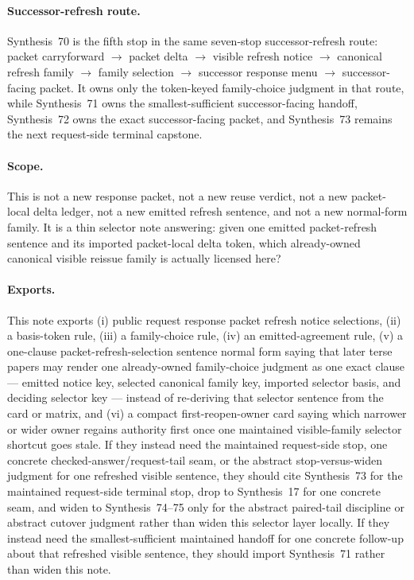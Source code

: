 \documentclass[11pt]{article}
\begin{document}
\paragraph{Successor-refresh route.}
Synthesis~70 is the fifth stop in the same seven-stop successor-refresh route: packet carryforward $\rightarrow$ packet delta $\rightarrow$ visible refresh notice $\rightarrow$ canonical refresh family $\rightarrow$ family selection $\rightarrow$ successor response menu $\rightarrow$ successor-facing packet.
It owns only the token-keyed family-choice judgment in that route, while Synthesis~71 owns the smallest-sufficient successor-facing handoff, Synthesis~72 owns the exact successor-facing packet, and Synthesis~73 remains the next request-side terminal capstone.

\paragraph{Scope.}
This is not a new response packet, not a new reuse verdict, not a new packet-local delta ledger, not a new emitted refresh sentence, and not a new normal-form family. It is a thin selector note answering: given one emitted packet-refresh sentence and its imported packet-local delta token, which already-owned canonical visible reissue family is actually licensed here?

\paragraph{Exports.}
This note exports (i) public request response packet refresh notice selections, (ii) a basis-token rule, (iii) a family-choice rule, (iv) an emitted-agreement rule, (v) a one-clause packet-refresh-selection sentence normal form saying that later terse papers may render one already-owned family-choice judgment as one exact clause --- emitted notice key, selected canonical family key, imported selector basis, and deciding selector key --- instead of re-deriving that selector sentence from the card or matrix, and (vi) a compact first-reopen-owner card saying which narrower or wider owner regains authority first once one maintained visible-family selector shortcut goes stale. If they instead need the maintained request-side stop, one concrete checked-answer/request-tail seam, or the abstract stop-versus-widen judgment for one refreshed visible sentence, they should cite Synthesis~73 for the maintained request-side terminal stop, drop to Synthesis~17 for one concrete seam, and widen to Synthesis~74--75 only for the abstract paired-tail discipline or abstract cutover judgment rather than widen this selector layer locally. If they instead need the smallest-sufficient maintained handoff for one concrete follow-up about that refreshed visible sentence, they should import Synthesis~71 rather than widen this note.
\end{document}
